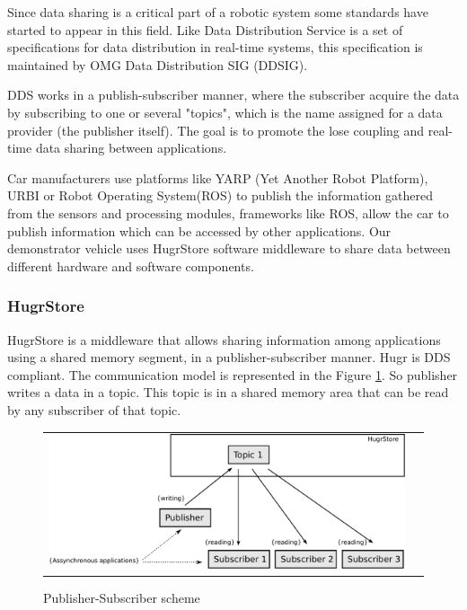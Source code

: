 Since data sharing is a critical part of a robotic system some standards have started to appear in this field. Like Data Distribution Service\cite{dds} is a set of specifications for data distribution in real-time systems, this specification is maintained by OMG Data Distribution SIG (DDSIG).

DDS works in a publish-subscriber manner, where the subscriber acquire the data by subscribing to one or several  "topics", which is the name assigned for a data provider (the publisher itself). The goal is to promote the lose coupling and real-time data sharing between applications.

Car manufacturers use platforms like YARP (Yet Another Robot Platform),  URBI \cite{urbi} or Robot Operating System(ROS) \cite{ros} to publish the information gathered from the sensors and processing modules, frameworks like ROS, allow the car to publish information  which can be accessed by other applications.%
Our demonstrator vehicle uses HugrStore \cite{hugr} software middleware to share data between different hardware and software components.


\subsubsection{HugrStore}
HugrStore is a middleware that allows sharing information among applications using a shared memory segment, in a publisher-subscriber manner. Hugr is DDS compliant. The communication model is represented in the Figure \ref{fig:dds:hugr}. So publisher writes a data in a topic. This topic is in a shared memory area that can be read by any subscriber of that topic.

\begin{figure}[H]
   \centering
     \begin{tabular}{lr}
       \includegraphics[scale=0.50]{img/fig:dds:hugr}
     \end{tabular}
   \caption{Publisher-Subscriber scheme}
   \label{fig:dds:hugr}
\end{figure}

